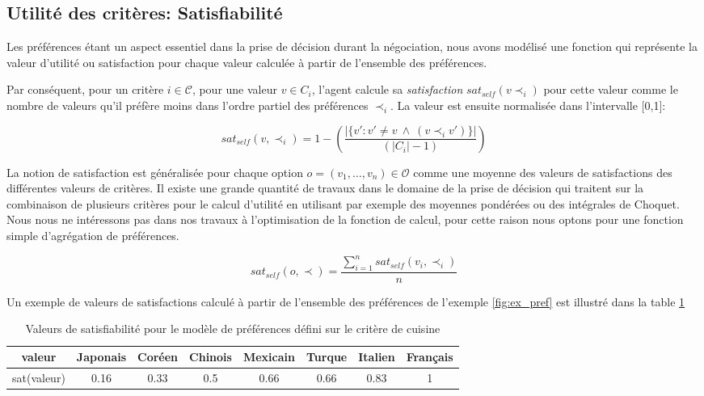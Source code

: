 \subsection{Utilité des critères: Satisfiabilité}

Les préférences étant un aspect essentiel dans la prise de décision durant la négociation, nous avons modélisé une fonction qui représente la valeur d'utilité ou satisfaction pour chaque valeur calculée à partir de l'ensemble des préférences. 

Par conséquent, pour un critère $i\in \mathcal{C}$, pour une valeur $v\in C_i$, l'agent calcule sa \emph{satisfaction} $sat_{self}(v \prec_i)$ pour cette valeur comme le nombre de valeurs qu'il préfère moins dans l'ordre partiel des préférences $\prec_i$. La valeur est ensuite normalisée dans l'intervalle [0,1]:

\begin{equation}
sat_{self}(v, \prec_i) =	1 - \left( \frac{|\{v' : v' \neq v \  \wedge \ (v \prec_i v')\}| }{( |C_i| - 1 )}\right)
\end{equation}

La notion de satisfaction est généralisée pour chaque option $ o= (v_1, \ldots, v_n) \in \mathcal{O}$ comme une moyenne des valeurs de satisfactions des différentes valeurs de critères. Il existe une grande quantité de travaux  dans le domaine de la prise de décision  qui traitent sur la combinaison de plusieurs critères pour le calcul d'utilité en utilisant par exemple des moyennes pondérées ou des intégrales de Choquet. Nous nous ne intéressons pas dans nos travaux à l'optimisation de la fonction de calcul, pour cette raison nous optons pour une fonction simple d'agrégation de préférences.

\begin{equation}
sat_{self}(o, \prec) = \frac{\sum_{i=1}^{n} sat_{self}(v_i, \prec_i) }{n}
\end{equation}

Un exemple de valeurs de satisfactions calculé à partir de l'ensemble des préférences de l'exemple \ref{fig:ex_pref} est illustré dans la table \ref{tab:sat}
\begin{table}[h]
	\centering
	{\scriptsize
		\begin{tabular}{ |c|c|c|c|c|c|c|c| }
			\hline				
			valeur & Japonais & Coréen & Chinois &  Mexicain & Turque & Italien & Français \\
			\hline
			
			sat(valeur) & 0.16 & 0.33 & 0.5 & 0.66 & 0.66 & 0.83 & 1\\
			\hline
			
	\end{tabular}}
	\caption{Valeurs de satisfiabilité pour le modèle de préférences défini sur le critère de cuisine}
	\label{tab:sat}
\end{table}


